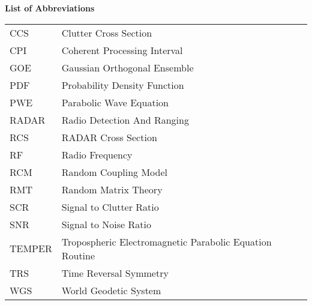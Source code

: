 \noindent\Large{\bf{List of Abbreviations}}

\vspace{24pt}

\small\normalsize

\begin{supertabular}{ll}
CCS & Clutter Cross Section \\
CPI & Coherent Processing Interval \\
GOE & Gaussian Orthogonal Ensemble \\
PDF & Probability Density Function \\
PWE & Parabolic Wave Equation \\
RADAR & Radio Detection And Ranging\\
RCS & RADAR Cross Section \\
RF & Radio Frequency \\
RCM & Random Coupling Model \\
RMT & Random Matrix Theory \\
SCR & Signal to Clutter Ratio \\
SNR & Signal to Noise Ratio\\
TEMPER & Tropospheric Electromagnetic Parabolic Equation Routine \\
TRS & Time Reversal Symmetry \\
WGS & World Geodetic System \\
\end{supertabular}
